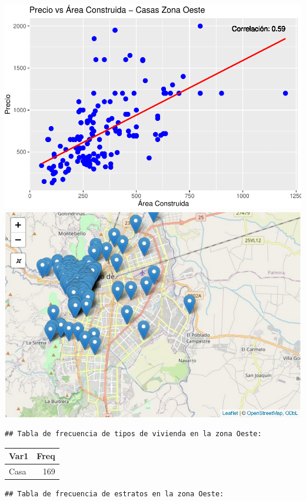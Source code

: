 \documentclass[
]{article}
\begin{document}
\includegraphics{A2_U2_InformeEjecutivo_files/figure-latex/unnamed-chunk-9-1.pdf}
\includegraphics{A2_U2_InformeEjecutivo_files/figure-latex/unnamed-chunk-9-2.pdf}

\begin{verbatim}
## Tabla de frecuencia de tipos de vivienda en la zona Oeste:
\end{verbatim}

\begin{longtable}[]{@{}lr@{}}
\toprule\noalign{}
Var1 & Freq \\
\midrule\noalign{}
\endhead
\bottomrule\noalign{}
\endlastfoot
Casa & 169 \\
\end{longtable}

\begin{verbatim}
## Tabla de frecuencia de estratos en la zona Oeste:
\end{verbatim}
\end{document}
